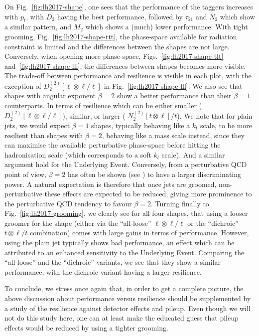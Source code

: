 On Fig.~\ref{fig:lh2017-shape}, one sees that the performance of
the taggers increases with $p_t$, with $D_2$ having the best performance,
followed by $\tau_{21}$ and $N_2$ which show a similar pattern, and
$M_2$ which shows a (much) lower performance.
%
With tight grooming, Fig.~\ref{fig:lh2017-shape-ttt}, the phase-space
available for radiation constraint is limited and the differences
between the shapes are not large. Conversely, when opening more
phase-space, \eg Figs.~\ref{fig:lh2017-shape-tlt}
and~\ref{fig:lh2017-shape-lll}, the differences between shapes becomes
more visible.
%
The trade-off between performance and resilience is visible in each
plot, with the exception of $D_2^{(2)}[\ell\otimes\ell/\ell]$ in
Fig.~\ref{fig:lh2017-shape-lll}.
%
We also see that shapes with angular exponent $\beta=2$ show a
better performance than their $\beta=1$ counterparts. In terms of
resilience which can be either smaller (\eg
$D_2^{(2)}[\ell\otimes\ell/\ell]$), similar, or larger (\eg
$N_2^{(2)}[t\otimes\ell]/t$).
%
We note that for plain jets, we would expect $\beta=1$ shapes,
typically behaving like a $k_t$ scale, to be
more resilient than shapes with $\beta=2$, behaving like a mass scale
instead, since they can maximise the available perturbative
phase-space before hitting the hadronisation scale (which corresponds
to a soft $k_t$ scale).
%
And a similar argument hold for the Underlying Event.
%
Conversely, from a perturbative QCD point of view, $\beta=2$ has often
be shown (see \eg \cite{Larkoski:2013eya,Salam:2016yht}) to have a
larger discriminating power.
%
A natural expectation is therefore that once jets are groomed,
non-perturbative these effects are expected to be reduced, giving more
prominence to the perturbative QCD tendency to favour $\beta=2$.
%
Turning finally to Fig.~\ref{fig:lh2017-grooming}, we clearly see for
all four shapes, that using a looser groomer for the shape (either via
the ``all-loose'' $\ell\otimes \ell/\ell$ or the ``dichroic'' $t\otimes\ell/t$
combination) comes with large gains in terms of performance.
%
However, using the plain jet typically shows bad performance, an
effect which can be attributed to an enhanced sensitivity to the
Underlying Event.
%
Comparing the ``all-loose'' and the ``dichroic'' variants, we see that
they show a similar performance, with the dichroic variant having
a larger resilience.


To conclude, we stress once again that, in order to get a complete
picture, the above discussion about performance versus resilience should
be supplemented by a study of the resilience against detector effects
and pileup. Even though we will not do this study here, one can at
least make the educated guess that pileup effects would be reduced by
using a tighter grooming.






